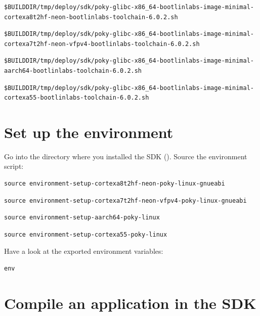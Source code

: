 {\footnotesize
\if{}
\begin{verbatim}
$BUILDDIR/tmp/deploy/sdk/poky-glibc-x86_64-bootlinlabs-image-minimal-cortexa8t2hf-neon-bootlinlabs-toolchain-6.0.2.sh
\end{verbatim}
\fi
\if{}
\begin{verbatim}
$BUILDDIR/tmp/deploy/sdk/poky-glibc-x86_64-bootlinlabs-image-minimal-cortexa7t2hf-neon-vfpv4-bootlinlabs-toolchain-6.0.2.sh
\end{verbatim}
\fi
\if{}
\begin{verbatim}
$BUILDDIR/tmp/deploy/sdk/poky-glibc-x86_64-bootlinlabs-image-minimal-aarch64-bootlinlabs-toolchain-6.0.2.sh
\end{verbatim}
\fi
\if{}
\begin{verbatim}
$BUILDDIR/tmp/deploy/sdk/poky-glibc-x86_64-bootlinlabs-image-minimal-cortexa55-bootlinlabs-toolchain-6.0.2.sh
\end{verbatim}
\fi
}

\section{Set up the environment}

Go into the directory where you installed the SDK
(). Source the environment script:
\if{}
\begin{verbatim}
source environment-setup-cortexa8t2hf-neon-poky-linux-gnueabi
\end{verbatim}
\fi
\if{}
\begin{verbatim}
source environment-setup-cortexa7t2hf-neon-vfpv4-poky-linux-gnueabi
\end{verbatim}
\fi
\if{}
\begin{verbatim}
source environment-setup-aarch64-poky-linux
\end{verbatim}
\fi
\if{}
\begin{verbatim}
source environment-setup-cortexa55-poky-linux
\end{verbatim}
\fi
Have a look at the exported environment variables:
\begin{verbatim}
env
\end{verbatim}

\section{Compile an application in the SDK}

